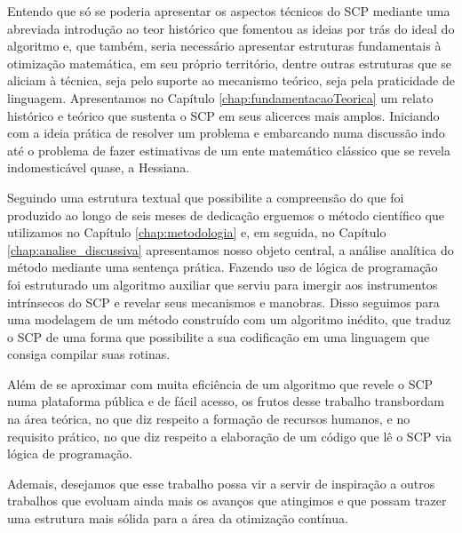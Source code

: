 Entendo que só se poderia apresentar os aspectos técnicos do SCP mediante uma abreviada introdução ao teor histórico que fomentou as ideias por trás do ideal do algoritmo e, que também, seria necessário apresentar estruturas fundamentais à otimização matemática, em seu próprio território, dentre outras estruturas que se aliciam à técnica, seja pelo suporte ao mecanismo teórico, seja pela praticidade de linguagem. Apresentamos no Capítulo \ref{chap:fundamentacaoTeorica} um relato histórico e teórico que sustenta o SCP em seus alicerces mais amplos. Iniciando com a ideia prática de resolver um problema e embarcando numa discussão indo até o problema de fazer estimativas de um ente matemático clássico que se revela indomesticável quase, a Hessiana.

Seguindo uma estrutura textual que possibilite a compreensão do que foi produzido ao longo de seis meses de dedicação erguemos o método científico que utilizamos no Capítulo \ref{chap:metodologia} e, em seguida, no Capítulo \ref{chap:analise_discussiva} apresentamos nosso objeto central, a análise analítica do método mediante uma sentença prática. Fazendo uso de lógica de programação foi estruturado um algoritmo auxiliar que serviu para imergir aos instrumentos intrínsecos do SCP e revelar seus mecanismos e manobras. Disso seguimos para uma modelagem de um método construído com um algoritmo inédito, que traduz o SCP de uma forma que possibilite a sua codificação em uma linguagem que consiga compilar suas rotinas.

Além de se aproximar com muita eficiência de um algoritmo que revele o SCP numa plataforma pública e de fácil acesso, os frutos desse trabalho transbordam na área teórica, no que diz respeito a formação de recursos humanos, e no requisito prático, no que diz respeito a elaboração de um código que lê o SCP via lógica de programação. 

Ademais, desejamos que esse trabalho possa vir a servir de inspiração a outros trabalhos que evoluam ainda mais os avanços que atingimos e que possam trazer uma estrutura mais sólida para a área da otimização contínua.